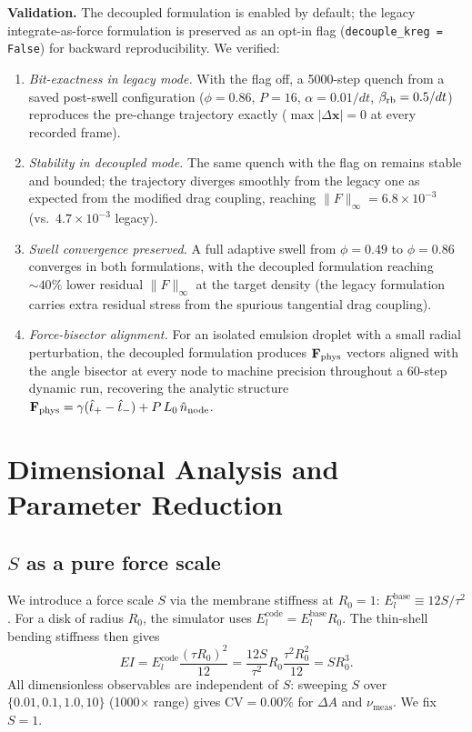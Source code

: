 \documentclass[aps,pre,twocolumn,floatfix,longbibliography]{revtex4-2}
\newcommand{\Elb}{E_l^{\mathrm{base}}}
\newcommand{\Elc}{E_l^{\mathrm{code}}}
\newcommand{\numes}{\nu_{\mathrm{meas}}}
\newcommand{\dA}{\Delta A}
\newcommand{\cv}{\mathrm{CV}}
\begin{document}
\textbf{Validation.} The decoupled formulation is enabled by default; the
legacy integrate-as-force formulation is preserved as an opt-in flag
(\texttt{decouple\_kreg = False}) for backward reproducibility. We verified:
\begin{enumerate}
\item \emph{Bit-exactness in legacy mode.} With the flag off, a 5000-step
quench from a saved post-swell configuration ($\phi=0.86$, $P=16$,
$\alpha = 0.01/dt$, $\beta_{\rm rb} = 0.5/dt$) reproduces the pre-change
trajectory exactly ($\max|\Delta\mathbf{x}| = 0$ at every recorded frame).
\item \emph{Stability in decoupled mode.} The same quench with the flag on
remains stable and bounded; the trajectory diverges smoothly from the
legacy one as expected from the modified drag coupling, reaching
$\|F\|_\infty = 6.8 \times 10^{-3}$ (vs.\ $4.7 \times 10^{-3}$ legacy).
\item \emph{Swell convergence preserved.} A full adaptive swell from
$\phi = 0.49$ to $\phi = 0.86$ converges in both formulations, with the
decoupled formulation reaching $\sim 40\%$ lower residual
$\|F\|_\infty$ at the target density (the legacy formulation carries
extra residual stress from the spurious tangential drag coupling).
\item \emph{Force-bisector alignment.} For an isolated emulsion droplet
with a small radial perturbation, the decoupled formulation produces
$\mathbf{F}_{\rm phys}$ vectors aligned with the angle bisector at every
node to machine precision throughout a 60-step dynamic run, recovering
the analytic structure $\mathbf{F}_{\rm phys} = \gamma(\hat{t}_+ - \hat{t}_-)
+ P\,L_0\,\hat{n}_{\rm node}$.
\end{enumerate}

\section{Dimensional Analysis and Parameter Reduction}
\label{sec:dimanalysis}

\subsection{$S$ as a pure force scale}

We introduce a force scale $S$ via the membrane stiffness at $R_0 = 1$:
$\Elb \equiv 12S/\tau^2$.  For a disk of radius $R_0$, the simulator uses
$\Elc = \Elb R_0$.  The thin-shell bending stiffness then gives
\begin{equation}
  EI = \Elc \frac{(\tau R_0)^2}{12}
     = \frac{12S}{\tau^2} R_0 \frac{\tau^2 R_0^2}{12} = S R_0^3.
\label{eq:EI}
\end{equation}
All dimensionless observables are independent of $S$: sweeping $S$ over
$\{0.01, 0.1, 1.0, 10\}$ (1000$\times$ range) gives $\cv = 0.00\%$ for
$\dA$ and $\numes$.  We fix $S = 1$.
\end{document}
